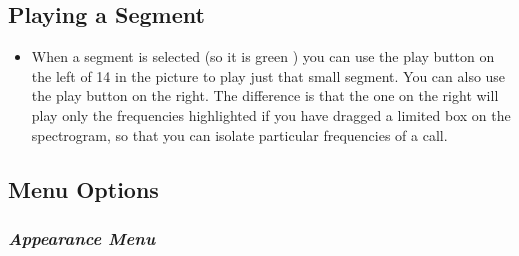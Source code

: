 \documentclass{article}
\begin{document}
\subsection{Playing a Segment}

\begin{itemize}
\item When a segment is selected (so it is green ) you can use the play button on the left of 14 in the picture to play just that small segment. You can also use the play button on the right. The difference is that the one on the right will play only the frequencies highlighted if you have dragged a limited box on the spectrogram, so that you can isolate particular frequencies of a call.  
\end{itemize}

\subsection{Menu Options}	

\subsubsection{{\em Appearance Menu}}
\end{document}
